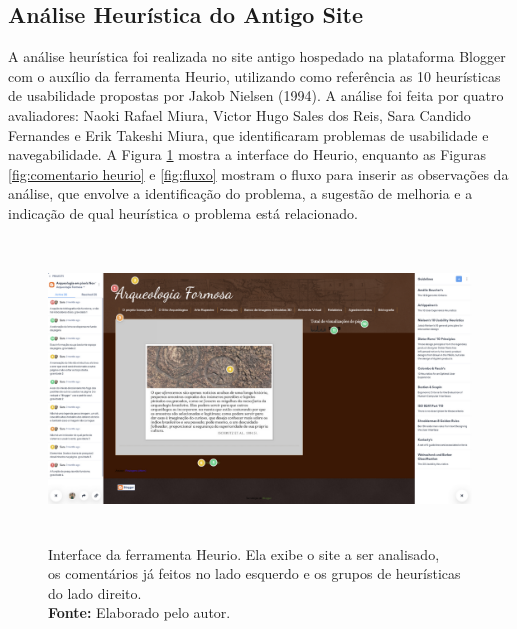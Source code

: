 \subsection{Análise Heurística do Antigo Site}
A análise heurística foi realizada no site antigo hospedado na plataforma Blogger com o auxílio da ferramenta Heurio, utilizando como referência as 10 heurísticas de usabilidade propostas por Jakob Nielsen (1994). A análise foi feita por quatro avaliadores: Naoki Rafael Miura, Victor Hugo Sales dos Reis, Sara Candido Fernandes e Erik Takeshi Miura, que identificaram problemas de usabilidade e navegabilidade.
A Figura \ref{fig:interface heurio} mostra a interface do Heurio, enquanto as Figuras \ref{fig:comentario heurio} e \ref{fig:fluxo} mostram o fluxo para inserir as observações da análise, que envolve a identificação do problema, a sugestão de melhoria e a indicação de qual heurística o problema está relacionado.
\begin{figure}[H]
    \centering
    \includegraphics[height=8cm, keepaspectratio]{img/heurio/interface heurio.png}
    \caption{ Interface da ferramenta Heurio. Ela exibe o site a ser analisado, \\ os comentários já feitos no lado esquerdo e os grupos de heurísticas do lado direito. \\
        \textbf{Fonte:} Elaborado pelo autor.}
    \label{fig:interface heurio}
\end{figure}


